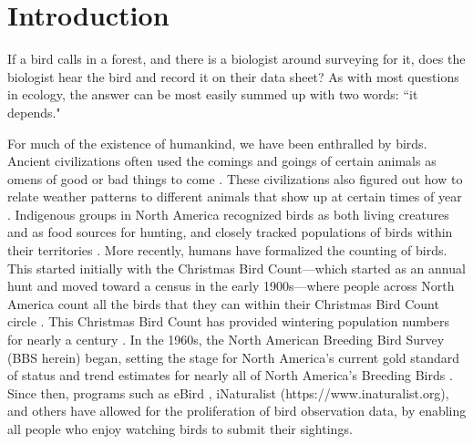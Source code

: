 \chapter{Introduction}

\par If a bird calls in a forest, and there is a biologist around surveying for it, does the biologist hear the bird and record it on their data sheet?
As with most questions in ecology, the answer can be most easily summed up with two words: ``it depends."

\par For much of the existence of humankind, we have been enthralled by birds.
Ancient civilizations often used the comings and goings of certain animals as omens of good or bad things to come \citep{ingersoll_birds_1923}.
These civilizations also figured out how to relate weather patterns to different animals that show up at certain times of year \citep{mynott_birds_2018}.
Indigenous groups in North America recognized birds as both living creatures and as food sources for hunting, and closely tracked populations of birds within their territories \citep{pitawanakwat_evening_2022}.
More recently, humans have formalized the counting of birds.
This started initially with the Christmas Bird Count---which started as an annual hunt and moved toward a census in the early 1900s---where people across North America count all the birds that they can within their Christmas Bird Count circle \citep{national_audubon_society_audubon_2024}.
This Christmas Bird Count has provided wintering population numbers for nearly a century \citep{bock_christmas_1981, niven_christmas_2004, national_audubon_society_audubon_2024}.
In the 1960s, the North American Breeding Bird Survey (BBS herein) began, setting the stage for North America's current gold standard of status and trend estimates for nearly all of North America's Breeding Birds \citep{sauer_first_2017, hudson_role_2017}.
Since then, programs such as eBird \citep{sullivan_ebird_2014}, iNaturalist (https://www.inaturalist.org), and others have allowed for the proliferation of bird observation data, by enabling all people who enjoy watching birds to submit their sightings.

